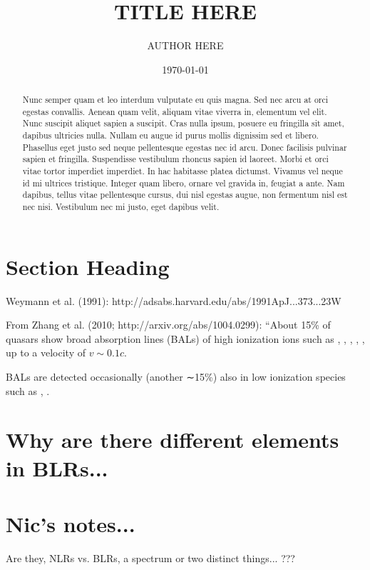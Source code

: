 \documentclass[11pt,a4paper]{article}
\begin{document}
\title{TITLE HERE}
\author{AUTHOR HERE}
\date{\today}
\maketitle



\begin{abstract}
Nunc semper quam et leo interdum vulputate eu quis magna. Sed nec arcu at orci egestas convallis. Aenean quam velit, aliquam vitae viverra in, elementum vel elit. Nunc suscipit aliquet sapien a suscipit. Cras nulla ipsum, posuere eu fringilla sit amet, dapibus ultricies nulla. Nullam eu augue id purus mollis dignissim sed et libero. Phasellus eget justo sed neque pellentesque egestas nec id arcu. Donec facilisis pulvinar sapien et fringilla. Suspendisse vestibulum rhoncus sapien id laoreet. Morbi et orci vitae tortor imperdiet imperdiet. In hac habitasse platea dictumst. Vivamus vel neque id mi ultrices tristique. Integer quam libero, ornare vel gravida in, feugiat a ante. Nam dapibus, tellus vitae pellentesque cursus, dui nisl egestas augue, non fermentum nisl est nec nisi. Vestibulum nec mi justo, eget dapibus velit.
\end{abstract}


\section{Section Heading}
Weymann et al. (1991): http://adsabs.harvard.edu/abs/1991ApJ...373...23W

\smallskip
\smallskip
\noindent
From Zhang et al. (2010; http://arxiv.org/abs/1004.0299): 
``About 15\% of quasars show broad absorption lines (BALs) of high ionization ions such as \nv, \civ, \SiIV, \lya, \ovi, up to a velocity of $v\sim0.1c$. 

\smallskip
\smallskip
\noindent
BALs are detected occasionally (another ∼15\%) also in low ionization species such as \mgii, \aliii. 


\section{Why are there different elements in BLRs...}

\section{Nic's notes...}
Are they, NLRs vs. BLRs, a spectrum or two distinct things... ???
\end{document}
